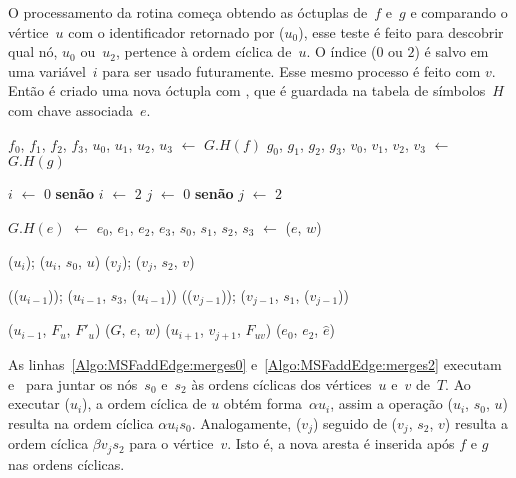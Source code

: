 O processamento da rotina \MSFaddEdge{} começa obtendo as óctuplas de~$f$ e~$g$ e comparando o vértice~$u$ com o identificador retornado por \LCOFindNode($u_{0}$), esse teste é feito para descobrir qual nó, $u_0$ ou~$u_2$, pertence à ordem cíclica de~$u$.
O índice ($0$ ou $2$) é salvo em uma variável~$i$ para ser usado futuramente.
Esse mesmo processo é feito com $v$.
Então é criado uma nova óctupla com \LCOMakeOcto{}, que é guardada na tabela de símbolos~$H$ com chave associada~$e$.


\begin{algorithm}[htb]
\caption{\MSFaddEdge($G$, $e$, $u$, $f$, $v$, $g$, $w$)}
\label{Algo:MSFaddEdge}
\begin{algorithmic}[1]

\State $f_0$, $f_1$, $f_2$, $f_3$, $u_0$, $u_1$, $u_2$, $u_3$ $\gets$ $G.H(f)$ \label{Algo:MSFaddEdge:linha:1}
\State $g_0$, $g_1$, $g_2$, $g_3$, $v_0$, $v_1$, $v_2$, $v_3$ $\gets$ $G.H(g)$ \label{Algo:MSFaddEdge:linha:2}

 $i$ $\gets$ $0$ \textbf{senão} $i$ $\gets$ $2$
\EndIf
{} $j$ $\gets$ $0$ \textbf{senão} $j$ $\gets$ $2$
\EndIf


\State $G.H(e)$ $\gets$ $e_0$, $e_1$, $e_2$, $e_3$, $s_0$, $s_1$, $s_2$, $s_3$ $\gets$ \LCOMakeOcto($e$, $w$) \label{Algo:MSFaddEdge:linha:const3}

\State \LCOCycle($u_i$); \LCOMerge($u_i$, $s_0$, $u$)\label{Algo:MSFaddEdge:merges0}
\State \LCOCycle($v_j$); \LCOMerge($v_j$, $s_2$, $v$)\label{Algo:MSFaddEdge:merges2}


\State \LCOCycle(\treapPredecessor($u_{i-1}$)); \LCOMerge($u_{i-1}$, $s_3$, \LCOFindNode($u_{i-1}$))\label{Algo:MSFaddEdge:merges1}
\State \LCOCycle(\treapPredecessor($v_{j-1}$)); \LCOMerge($v_{j-1}$, $s_1$, \LCOFindNode($v_{j-1}$))\label{Algo:MSFaddEdge:merges3}

\label{Algo:MSFaddEdge:linha:deteccao-caso}
\State \LCOSplit($u_{i-1}$, $F_u$, $F'_u$)\label{Algo:MSFaddEdge:linha:splitnaoponte}
\State \MSFupdate($G$, $e$, $w$)
\Else
\State \LCOMerge($u_{i+1}$, $v_{j+1}$, $F_{uv}$)\label{Algo:MSFaddEdge:linha:mergeponte}
\State \LCOMerge($e_0$, $e_2$, $\hat e$)
\EndIf
\end{algorithmic}
\end{algorithm}

As linhas~\ref{Algo:MSFaddEdge:merges0} e~\ref{Algo:MSFaddEdge:merges2} executam \LCOCycle{} e~\LCOMerge{} para juntar os nós~$s_0$ e~$s_2$ às ordens cíclicas dos vértices~$u$ e~$v$ de~$\hat T$.  
Ao executar \LCOCycle($u_i$), a ordem cíclica de $u$ obtém forma~$\alpha u_i$, assim a operação \LCOMerge($u_i$, $s_0$, $u$) resulta na ordem cíclica $\alpha u_is_0$.
Analogamente, \LCOCycle($v_j$) seguido de \LCOMerge($v_j$, $s_2$, $v$) resulta a ordem cíclica $\beta v_j s_2$ para o vértice~$v$.
Isto é, a nova aresta é inserida após $f$ e $g$ nas ordens cíclicas.

